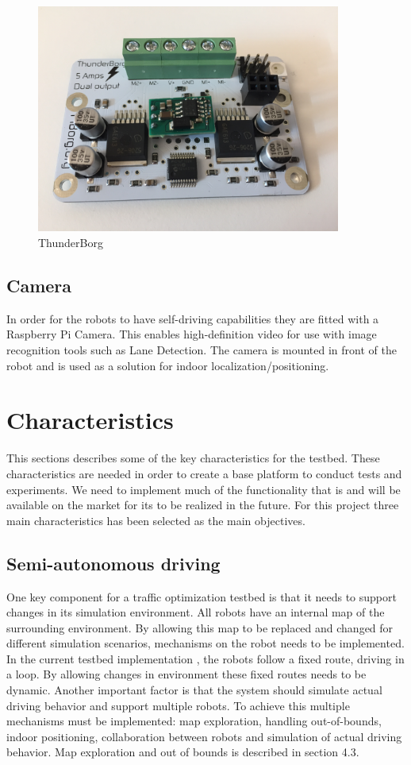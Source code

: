 \begin{figure}[H]
\centering
\includegraphics[width=10cm]{images/thunderborg.jpg}
\caption{ThunderBorg}
\label{fig:thunderborg}
\end{figure}

\subsection{Camera}
In order for the robots to have self-driving capabilities they are fitted with a Raspberry Pi Camera. This enables high-definition video for use with image recognition tools such as Lane Detection. The camera is mounted in front of the robot and is used as a solution for indoor localization/positioning. 

\section{Characteristics}
This sections describes some of the key characteristics for the testbed. These characteristics are needed in order to create a base platform to conduct tests and experiments. We need to implement much of the functionality that is and will be available on the market for \gls{its} to be realized in the future. For this project three main characteristics has been selected as the main objectives. 

\subsection{Semi-autonomous driving}
One key component for a traffic optimization testbed is that it needs to support changes in its simulation environment. All robots have an internal map of the surrounding
environment. By allowing this map to be replaced and changed for different simulation scenarios, mechanisms on the robot needs to be implemented. In the
current testbed implementation \cite{DevelopmentOfVTL}, the robots follow a fixed route, driving in a
loop. By allowing changes in environment these fixed routes needs to be dynamic.
\newline
\newline
Another important factor is that the system should simulate actual driving behavior
and support multiple robots. To achieve this multiple mechanisms must be implemented:
map exploration, handling out-of-bounds, indoor positioning, collaboration
between robots and simulation of actual driving behavior. Map exploration and out of bounds is described in section 4.3.

